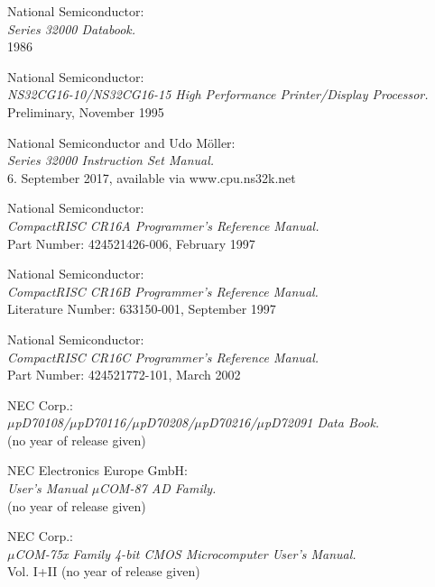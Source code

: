  National Semiconductor: \\
                  {\em Series 32000 Databook.\/} \\
                  1986

 National Semiconductor: \\
                  {\em NS32CG16-10/NS32CG16-15 High Performance Printer/Display Processor.\/} \\
                  Preliminary, November 1995

 National Semiconductor and Udo M\"oller: \\
                  {\em Series 32000 Instruction Set Manual.\/} \\
                  6. September 2017, available via www.cpu.ns32k.net

 National Semiconductor: \\
                  {\em CompactRISC CR16A Programmer's Reference Manual.} \\
                  Part Number: 424521426-006, February 1997

 National Semiconductor: \\
                  {\em CompactRISC CR16B Programmer's Reference Manual.} \\
                  Literature Number: 633150-001, September 1997

 National Semiconductor: \\
                  {\em CompactRISC CR16C Programmer's Reference Manual.} \\
                  Part Number: 424521772-101, March 2002

 NEC Corp.: \\
   	       {\em $\mu$pD70108/$\mu$pD70116/$\mu$pD70208/$\mu$pD70216/$\mu$pD72091 
               Data Book.\/} \\
               (no year of release given)

 NEC Electronics Europe GmbH: \\
                  {\em User's Manual $\mu$COM-87 AD Family.\/} \\
		  (no year of release given)

 NEC Corp.: \\
                {\em $\mu$COM-75x Family 4-bit CMOS Microcomputer User's
                 Manual.\/} \\
                Vol. I+II (no year of release given)

